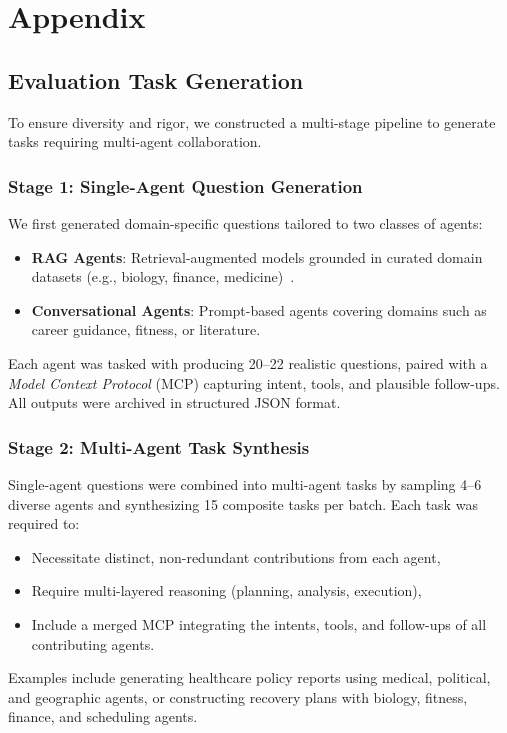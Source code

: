 \appendix
\section{Appendix}
\subsection{Evaluation Task Generation}
To ensure diversity and rigor, we constructed a multi-stage pipeline to generate tasks requiring multi-agent collaboration.

\subsubsection{Stage 1: Single-Agent Question Generation}
We first generated domain-specific questions tailored to two classes of agents:
\begin{itemize}
    \item \textbf{RAG Agents}: Retrieval-augmented models grounded in curated domain datasets (e.g., biology, finance, medicine)~\cite{huggingface}.
    \item \textbf{Conversational Agents}: Prompt-based agents covering domains such as career guidance, fitness, or literature.
\end{itemize}
Each agent was tasked with producing 20--22 realistic questions, paired with a \textit{Model Context Protocol} (MCP) capturing intent, tools, and plausible follow-ups. All outputs were archived in structured JSON format.

\subsubsection{Stage 2: Multi-Agent Task Synthesis}
Single-agent questions were combined into multi-agent tasks by sampling 4--6 diverse agents and synthesizing 15 composite tasks per batch. Each task was required to:
\begin{itemize}
    \item Necessitate distinct, non-redundant contributions from each agent,
    \item Require multi-layered reasoning (planning, analysis, execution),
    \item Include a merged MCP integrating the intents, tools, and follow-ups of all contributing agents.
\end{itemize}
Examples include generating healthcare policy reports using medical, political, and geographic agents, or constructing recovery plans with biology, fitness, finance, and scheduling agents.

